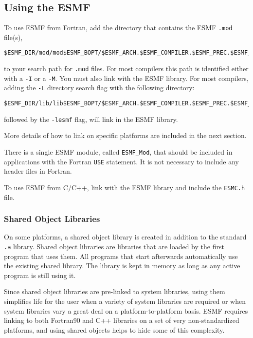 
\subsection{Using the ESMF}
\label{UsingLibrary}

To use ESMF from Fortran, add the directory that contains
the ESMF {\tt *.mod} file(s),

\begin{verbatim}
$ESMF_DIR/mod/mod$ESMF_BOPT/$ESMF_ARCH.$ESMF_COMPILER.$ESMF_PREC.$ESMF_SITE
\end{verbatim} 

to your search path for {\tt *.mod} files.  For most compilers this path 
is identified either with a {\tt -I} or a {\tt -M}.  You must also link 
with the ESMF library.  For most compilers, adding the {\tt -L} directory 
search flag with the following directory:

\begin{verbatim}
$ESMF_DIR/lib/lib$ESMF_BOPT/$ESMF_ARCH.$ESMF_COMPILER.$ESMF_PREC.$ESMF_SITE
\end{verbatim} 

followed by the {\tt -lesmf} flag, will link in the ESMF library.

More details of how to link on specific platforms are included in the 
next section.

There is a single ESMF module, called {\tt ESMF\_Mod}, that should be 
included in applications with the Fortran {\tt USE} statement.  It 
is not necessary to include any header files in Fortran.

To use ESMF from C/C++, link with the ESMF library 
and include the {\tt ESMC.h} file. 

\subsubsection{Shared Object Libraries}

On some platforms, a shared object library is created in addition to the
standard {\tt .a} library.
Shared object libraries are libraries that are loaded by the first program 
that uses them. All programs that start afterwards automatically use the 
existing shared library. The library is kept in memory as long as any 
active program is still using it. 

Since shared object libraries are pre-linked to system libraries, using them
simplifies life for the user when a variety of system libraries are
required or when system libraries vary a great deal on a 
platform-to-platform basis.  ESMF requires linking to both Fortran90 and
C++ libraries on a set of very non-standardized platforms, and using
shared objects helps to hide some of this complexity.

